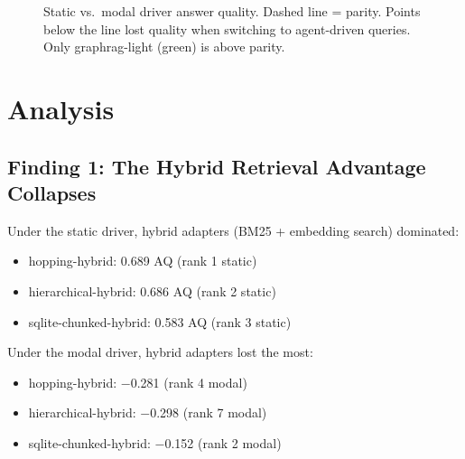 \documentclass[11pt,a4paper]{article}
\begin{document}
\begin{figure}[H]
\centering
{}
\caption{Static vs.\ modal driver answer quality. Dashed line = parity. Points below the line lost quality when switching to agent-driven queries. Only graphrag-light (green) is above parity.}
\label{fig:static-modal}
\end{figure}

\section{Analysis}

\subsection{Finding 1: The Hybrid Retrieval Advantage Collapses}

Under the static driver, hybrid adapters (BM25 + embedding search) dominated:
\begin{itemize}[nosep]
  \item hopping-hybrid: 0.689 AQ (rank 1 static)
  \item hierarchical-hybrid: 0.686 AQ (rank 2 static)
  \item sqlite-chunked-hybrid: 0.583 AQ (rank 3 static)
\end{itemize}

Under the modal driver, hybrid adapters lost the most:
\begin{itemize}[nosep]
  \item hopping-hybrid: $-$0.281 (rank 4 modal)
  \item hierarchical-hybrid: $-$0.298 (rank 7 modal)
  \item sqlite-chunked-hybrid: $-$0.152 (rank 2 modal)
\end{itemize}
\end{document}
